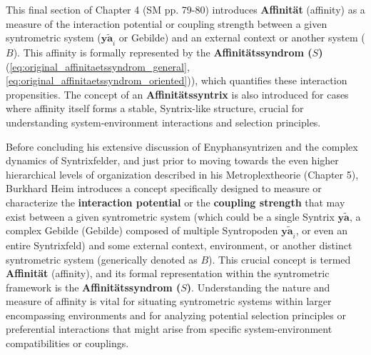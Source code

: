 \documentclass[12pt]{article}
\newcommand{\syntrix}{\bm{y\widetilde{a}}}
\newcommand{\syntrometrischesGebilde}{\text{Gebilde}}
\newcommand{\affinitaetssyndrom}{S}
\begin{document}
This final section of Chapter 4 (SM pp. 79-80) introduces \textbf{Affinität} (affinity) as a measure of the interaction potential or coupling strength between a given syntrometric system (\(\syntrix_i\) or Gebilde) and an external context or another system (\(B\)). This affinity is formally represented by the \textbf{Affinitätssyndrom (\(\affinitaetssyndrom\))} (\eqref{eq:original_affinitaetssyndrom_general}, \eqref{eq:original_affinitaetssyndrom_oriented})), which quantifies these interaction propensities. The concept of an \textbf{Affinitätssyntrix} is also introduced for cases where affinity itself forms a stable, Syntrix-like structure, crucial for understanding system-environment interactions and selection principles.

Before concluding his extensive discussion of Enyphansyntrizen and the complex dynamics of Syntrixfelder, and just prior to moving towards the even higher hierarchical levels of organization described in his Metroplextheorie (Chapter 5), Burkhard Heim introduces a concept specifically designed to measure or characterize the \textbf{interaction potential} or the \textbf{coupling strength} that may exist between a given syntrometric system (which could be a single Syntrix \( \syntrix \), a complex Gebilde (\(\syntrometrischesGebilde\)) composed of multiple Syntropoden \( \syntrix_i \), or even an entire Syntrixfeld) and some external context, environment, or another distinct syntrometric system (generically denoted as \( B \)). This crucial concept is termed \textbf{Affinität} (affinity), and its formal representation within the syntrometric framework is the \textbf{Affinitätssyndrom (\( \affinitaetssyndrom \))}. Understanding the nature and measure of affinity is vital for situating syntrometric systems within larger encompassing environments and for analyzing potential selection principles or preferential interactions that might arise from specific system-environment compatibilities or couplings.
\end{document}
